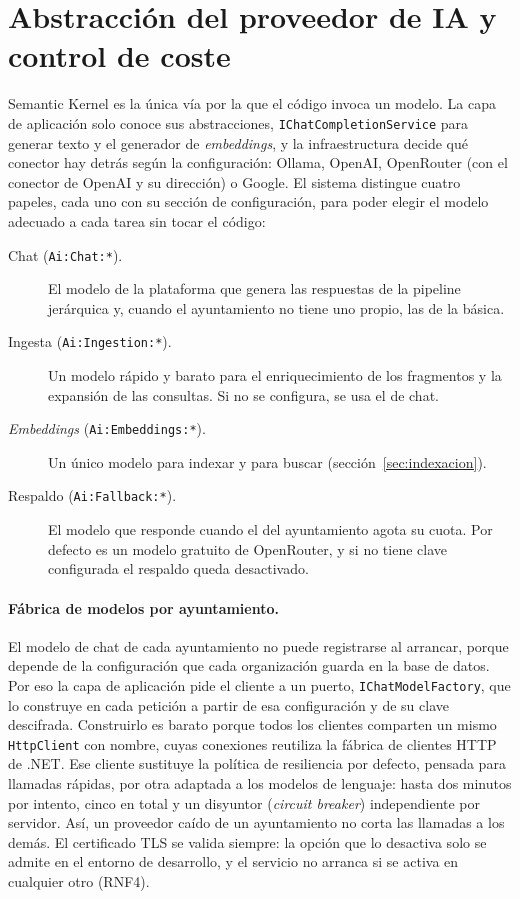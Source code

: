 \section{Abstracción del proveedor de IA y control de coste}
\label{sec:proveedor-ia}

Semantic Kernel \cite{semantickernel} es la única vía por la que el código invoca un modelo. La capa de aplicación solo conoce sus abstracciones, \texttt{IChatCompletionService} para generar texto y el generador de \emph{embeddings}, y la infraestructura decide qué conector hay detrás según la configuración: Ollama, OpenAI, OpenRouter (con el conector de OpenAI y su dirección) o Google. El sistema distingue cuatro papeles, cada uno con su sección de configuración, para poder elegir el modelo adecuado a cada tarea sin tocar el código:

\begin{description}
  \item[Chat (\texttt{Ai:Chat:*}).] El modelo de la plataforma que genera las respuestas de la pipeline jerárquica y, cuando el ayuntamiento no tiene uno propio, las de la básica.
  \item[Ingesta (\texttt{Ai:Ingestion:*}).] Un modelo rápido y barato para el enriquecimiento de los fragmentos y la expansión de las consultas. Si no se configura, se usa el de chat.
  \item[\emph{Embeddings} (\texttt{Ai:Embeddings:*}).] Un único modelo para indexar y para buscar (sección~\ref{sec:indexacion}).
  \item[Respaldo (\texttt{Ai:Fallback:*}).] El modelo que responde cuando el del ayuntamiento agota su cuota. Por defecto es un modelo gratuito de OpenRouter, y si no tiene clave configurada el respaldo queda desactivado.
\end{description}

\paragraph{Fábrica de modelos por ayuntamiento.} El modelo de chat de cada ayuntamiento no puede registrarse al arrancar, porque depende de la configuración que cada organización guarda en la base de datos. Por eso la capa de aplicación pide el cliente a un puerto, \texttt{IChatModelFactory}, que lo construye en cada petición a partir de esa configuración y de su clave descifrada. Construirlo es barato porque todos los clientes comparten un mismo \texttt{HttpClient} con nombre, cuyas conexiones reutiliza la fábrica de clientes HTTP de .NET. Ese cliente sustituye la política de resiliencia por defecto, pensada para llamadas rápidas, por otra adaptada a los modelos de lenguaje: hasta dos minutos por intento, cinco en total y un disyuntor (\emph{circuit breaker}) independiente por servidor. Así, un proveedor caído de un ayuntamiento no corta las llamadas a los demás. El certificado TLS se valida siempre: la opción que lo desactiva solo se admite en el entorno de desarrollo, y el servicio no arranca si se activa en cualquier otro (RNF4).

